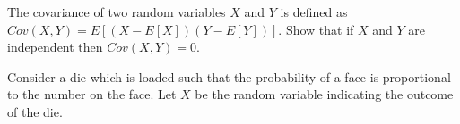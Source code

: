 \documentclass[solution,addpoints,12pt]{exam}
\begin{document}
\begin{questions}

\question [\half] The covariance of two random variables $X$ and $Y$ is defined as $Cov(X,Y) = E[(X-E[X])(Y-E[Y])]$. Show that if $X$ and $Y$ are independent then $Cov(X,Y) = 0$.
\begin{solution}
\end{solution}


\question Consider a die which is loaded such that the probability of a face is proportional to the number on the face. Let $X$ be the random variable indicating the outcome of the die.


\end{questions}
\end{document}
